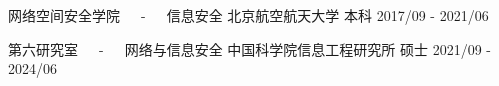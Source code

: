 

\begin{cventries}

  \cventry
    {网络空间安全学院~~~-~~~信息安全} %
    {北京航空航天大学} %
    {本科} %
    {2017/09 - 2021/06} %
    {
    }

  \cventry
    {第六研究室~~~-~~~网络与信息安全} %
    {中国科学院信息工程研究所} %
    {硕士} %
    {2021/09 - 2024/06} %
    {
    }

\end{cventries}
